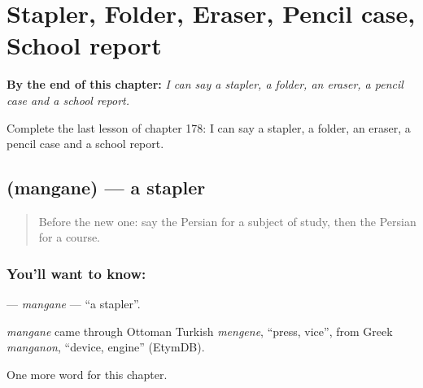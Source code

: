 
\chapter{Stapler, Folder, Eraser, Pencil case, School report}
\label{ch:fa-stapler-folder-eraser-pencil-case-school-report}

\begin{chapteropening}
\textbf{By the end of this chapter:} \emph{I can say a stapler, a folder, an eraser, a pencil case and a school report.}

Complete the last lesson of chapter 178: I can say a stapler, a folder, an eraser, a pencil case and a school report.
\end{chapteropening}

\section[\texorpdfstring{\fa{منگنه} (mangane)}{منگنه (mangane)}]{ (mangane) — a stapler}

\label{lesson:FA-C178-mangane}



\begin{quote}
Before the new one: say the Persian for a subject of study, then the Persian for a course.
\end{quote}

\subsection*{You'll want to know: }
\textbf{} — \emph{mangane} — \textquotedblleft{}a stapler\textquotedblright{}.

\begin{cousinweb}
\emph{mangane} came through Ottoman Turkish \emph{mengene}, \textquotedblleft{}press, vice\textquotedblright{}, from Greek \emph{manganon}, \textquotedblleft{}device, engine\textquotedblright{} (EtymDB).
\end{cousinweb}

\begin{grammarlens}[title={What you've built}]
One more word for this chapter.
\end{grammarlens}

